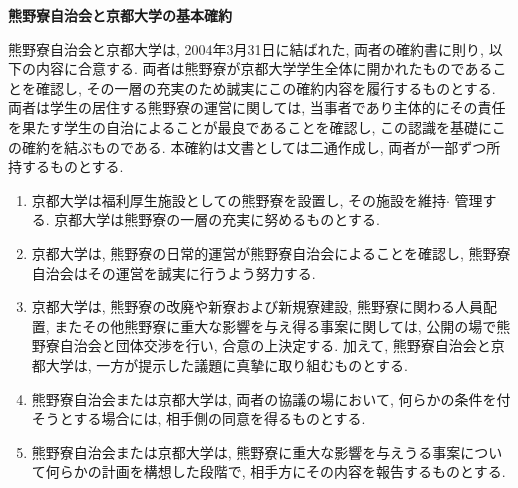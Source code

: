 \documentclass[10pt,b5jsbook,dvips,dvipdfmx,openany]{jsbook}
\theoremstyle{definition}
\begin{document}
		\begin{shadebox}

		\centerline{ \bf 熊野寮自治会と京都大学の基本確約}

		熊野寮自治会と京都大学は, 2004年3月31日に結ばれた, 両者の確約書に則り, 以下の内容に合意する. 両者は熊野寮が京都大学学生全体に開かれたものであることを確認し, その一層の充実のため誠実にこの確約内容を履行するものとする. 両者は学生の居住する熊野寮の運営に関しては, 当事者であり主体的にその責任を果たす学生の自治によることが最良であることを確認し, この認識を基礎にこの確約を結ぶものである. 
本確約は文書としては二通作成し, 両者が一部ずつ所持するものとする. 

		\begin{enumerate}
		\renewcommand{\labelenumi}{(\arabic{enumi})}
		\item 京都大学は福利厚生施設としての熊野寮を設置し, その施設を維持$ \cdot $ 管理する. 京都大学は熊野寮の一層の充実に努めるものとする. 
		\item 京都大学は, 熊野寮の日常的運営が熊野寮自治会によることを確認し, 熊野寮自治会はその運営を誠実に行うよう努力する. 
		\item 京都大学は, 熊野寮の改廃や新寮および新規寮建設, 熊野寮に関わる人員配置, またその他熊野寮に重大な影響を与え得る事案に関しては, 公開の場で熊野寮自治会と団体交渉を行い, 合意の上決定する. 加えて, 熊野寮自治会と京都大学は, 一方が提示した議題に真摯に取り組むものとする. 
		\item 熊野寮自治会または京都大学は, 両者の協議の場において, 何らかの条件を付そうとする場合には, 相手側の同意を得るものとする. 
		\item 熊野寮自治会または京都大学は, 熊野寮に重大な影響を与えうる事案について何らかの計画を構想した段階で, 相手方にその内容を報告するものとする. 
		\end{enumerate}


		\end{shadebox}
\end{document}
